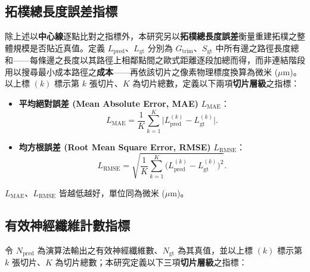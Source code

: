 \subsection{拓樸總長度誤差指標}

除上述以\textbf{中心線}逐點比對之指標外，本研究另以\textbf{拓樸總長度誤差}衡量重建拓樸之整體規模是否貼近真值。定義 $L_{\text{pred}}$、$L_{\text{gt}}$ 分別為 $G_{\text{trim}}$、$S_{\text{gt}}$ 中所有邊之路徑長度總和——每條邊之長度以其路徑上相鄰點間之歐式距離逐段加總而得，而非連結階段用以搜尋最小成本路徑之\textbf{成本}——再依該切片之像素物理標度換算為微米 ($\mu$m)。以上標 $(k)$ 標示第 $k$ 張切片、$K$ 為切片總數，定義以下兩項\textbf{切片層級}之指標：

\begin{itemize}
  \item \textbf{平均絕對誤差 (Mean Absolute Error, MAE)} $L_{\text{MAE}}$：
    \begin{equation}
      L_{\text{MAE}} = \frac{1}{K} \sum_{k=1}^{K} \bigl| L^{(k)}_{\text{pred}} - L^{(k)}_{\text{gt}} \bigr|.
      \label{eq:lmae}
    \end{equation}
  \item \textbf{均方根誤差 (Root Mean Square Error, RMSE)} $L_{\text{RMSE}}$：
    \begin{equation}
      L_{\text{RMSE}} = \sqrt{\dfrac{1}{K} \sum_{k=1}^{K} \bigl( L^{(k)}_{\text{pred}} - L^{(k)}_{\text{gt}} \bigr)^2}.
      \label{eq:lrmse}
    \end{equation}
\end{itemize}

\noindent $L_{\text{MAE}}$、$L_{\text{RMSE}}$ 皆越低越好，單位同為微米 ($\mu$m)。

\subsection{有效神經纖維計數指標}

令 $N_{\text{pred}}$ 為演算法輸出之有效神經纖維數、$N_{\text{gt}}$ 為其真值，並以上標 $(k)$ 標示第 $k$ 張切片、$K$ 為切片總數；本研究定義以下三項\textbf{切片層級}之指標：

